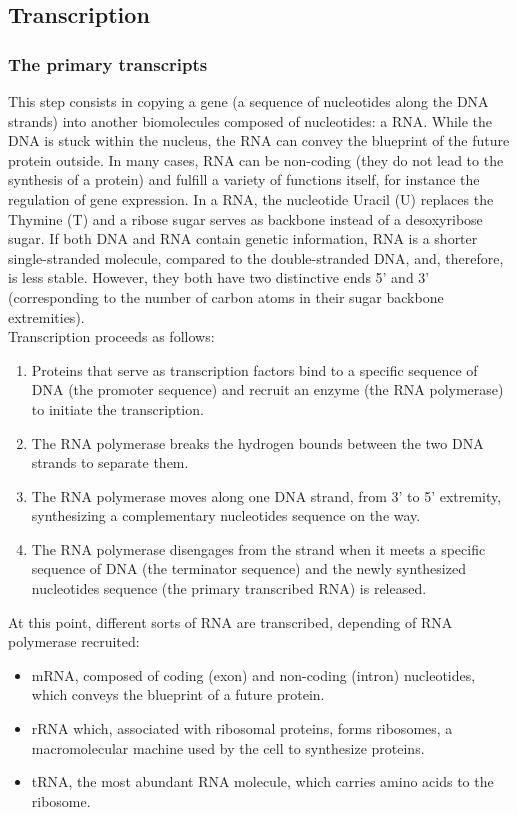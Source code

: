 \subsection{Transcription}
\label{subsec:intro_transcription}

\subsubsection{The primary transcripts}

This step consists in copying a gene (a sequence of nucleotides along the \ac{DNA} strands) into another biomolecules composed of nucleotides: a \ac{RNA}.
While the \ac{DNA} is stuck within the nucleus, the \ac{RNA} can convey the blueprint of the future protein outside.
In many cases, \ac{RNA} can be non-coding (they do not lead to the synthesis of a protein) and fulfill a variety of functions itself, for instance the regulation of gene expression.
In a \ac{RNA}, the nucleotide Uracil (U) replaces the Thymine (T) and a ribose sugar serves as backbone instead of a desoxyribose sugar.
If both \ac{DNA} and \ac{RNA} contain genetic information, \ac{RNA} is a shorter single-stranded molecule, compared to the double-stranded \ac{DNA}, and, therefore, is less stable.
However, they both have two distinctive ends 5' and 3' (corresponding to the number of carbon atoms in their sugar backbone extremities).\\

\noindent
Transcription proceeds as follows:
\begin{enumerate}
	\setlength\itemsep{0.1em}
	\item Proteins that serve as transcription factors bind to a specific sequence of \ac{DNA} (the promoter sequence) and recruit an enzyme (the \ac{RNA} polymerase) to initiate the transcription.
	\item The \ac{RNA} polymerase breaks the hydrogen bounds between the two \ac{DNA} strands to separate them.
	\item The \ac{RNA} polymerase moves along one \ac{DNA} strand, from 3' to 5' extremity, synthesizing a complementary nucleotides sequence on the way.
	\item The \ac{RNA} polymerase disengages from the strand when it meets a specific sequence of \ac{DNA} (the terminator sequence) and the newly synthesized nucleotides sequence (the primary transcribed \ac{RNA}) is released.
\end{enumerate}

\noindent
At this point, different sorts of \ac{RNA} are transcribed, depending of \ac{RNA} polymerase recruited:
\begin{itemize}
	\setlength\itemsep{0.1em}
	\item \ac{mRNA}, composed of coding (exon) and non-coding (intron) nucleotides, which conveys the blueprint of a future protein.
	\item \ac{rRNA} which, associated with ribosomal proteins, forms ribosomes, a macromolecular machine used by the cell to synthesize proteins.
	\item \ac{tRNA}, the most abundant \ac{RNA} molecule, which carries amino acids to the ribosome.
\end{itemize}

